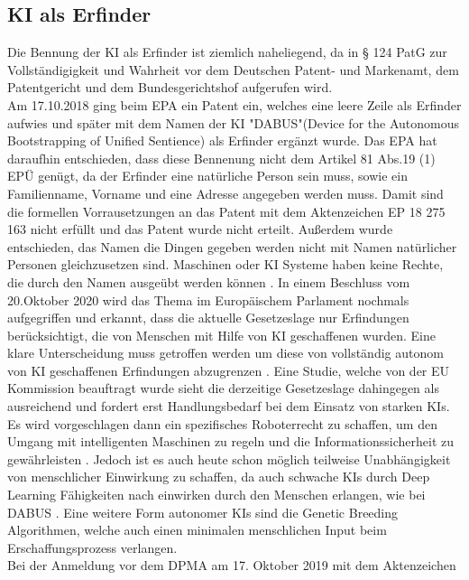\subsection{KI als Erfinder}
Die Bennung der KI als Erfinder ist ziemlich naheliegend, 
da in § 124 PatG zur Vollständigigkeit und Wahrheit vor dem
Deutschen Patent- und Markenamt, 
dem Patentgericht und dem Bundesgerichtshof aufgerufen wird.
\\
Am 17.10.2018 ging beim \gls{EPA} ein Patent ein, 
welches eine leere Zeile als Erfinder aufwies und später mit 
dem Namen der KI 
"DABUS"(Device for the Autonomous Bootstrapping of Unified Sentience) 
als Erfinder ergänzt wurde. 
Das EPA hat daraufhin entschieden, 
dass diese Bennenung nicht dem Artikel 81 Abs.19 (1) \gls{EPÜ}  genügt,
da der Erfinder eine natürliche Person sein muss, sowie ein 
Familienname, Vorname und eine Adresse angegeben werden muss.
Damit sind die formellen Vorrausetzungen an das Patent mit dem Aktenzeichen
EP 18 275 163 nicht erfüllt und das Patent wurde nicht erteilt. 
Außerdem wurde entschieden, das Namen die Dingen gegeben werden nicht
mit Namen natürlicher Personen gleichzusetzen sind. Maschinen oder KI
Systeme haben keine Rechte, die durch den Namen ausgeübt werden können 
\cite{EPA27012020}. 
In einem Beschluss vom 20.Oktober 2020 wird das Thema im Europäischem
Parlament nochmals aufgegriffen und erkannt, 
dass die aktuelle Gesetzeslage nur Erfindungen berücksichtigt,
die von Menschen mit Hilfe von KI geschaffenen wurden. 
Eine klare Unterscheidung muss getroffen werden um diese 
von vollständig autonom von KI geschaffenen Erfindungen abzugrenzen
\cite{TextsAdoptedIntellectual}.
Eine Studie, welche von der EU Kommission beauftragt wurde 
sieht die derzeitige Gesetzeslage dahingegen als ausreichend 
und fordert erst Handlungsbedarf bei dem Einsatz von starken KIs.
Es wird vorgeschlagen dann ein spezifisches Roboterrecht zu schaffen, 
um den Umgang mit intelligenten Maschinen zu regeln 
und die Informationssicherheit zu gewährleisten
\cite{gutaAPPLICABILITYGDPRARTIFICIAL2022}.
Jedoch ist es auch heute schon möglich teilweise 
Unabhängigkeit von menschlicher Einwirkung
zu schaffen, da auch schwache KIs durch Deep Learning 
Fähigkeiten nach einwirken durch den Menschen erlangen, wie bei DABUS
\cite{surdenMachineLearningLaw}\cite{dornisDornisSchopfungOhne2021}.
Eine weitere Form autonomer KIs sind die Genetic Breeding Algorithmen,
welche auch einen minimalen menschlichen Input beim Erschaffungsprozess 
verlangen.
\\
Bei der Anmeldung vor dem DPMA am 17. Oktober 2019 mit dem Aktenzeichen

